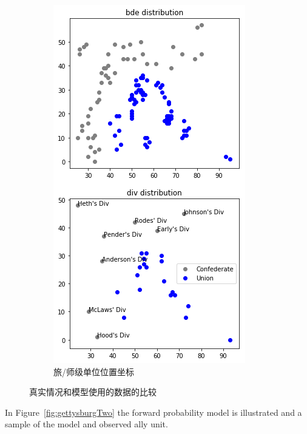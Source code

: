 \documentclass{article}
\begin{document}
\begin{figure}[ht]
\begin{subfigure}[b]{0.49\linewidth}
    \includegraphics[width=\linewidth]{gettysburg-model.png}
    \caption{旅/师级单位位置坐标}
  \end{subfigure}
  \caption{真实情况和模型使用的数据的比较}
  \label{fig:gettysburg}
\end{figure}

In Figure~\ref{fig:gettysburgTwo} the forward probability model is illustrated and a sample of the model and observed
ally unit.
\end{document}
